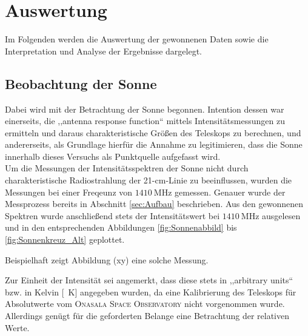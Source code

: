 \section{Auswertung}
Im Folgenden werden die Auswertung der gewonnenen Daten sowie die Interpretation und Analyse der Ergebnisse dargelegt.
    \subsection{Beobachtung der Sonne}
    Dabei wird mit der Betrachtung der Sonne begonnen.
    Intention dessen war einerseits, die ,,antenna response function`` mittels Intensitätsmessungen zu ermitteln und
    daraus charakteristische Größen des Teleskops zu berechnen, und andererseits, als Grundlage hierfür die Annahme zu legitimieren,
    dass die Sonne innerhalb dieses Versuchs als Punktquelle aufgefasst wird.\\

    Um die Messungen der Intensitätsspektren der Sonne nicht durch charakteristische Radiostrahlung der
    21-\si{\centi \metre}-Linie zu beeinflussen,
    wurden die Messungen bei einer Freqeunz von $\SI{1410}{\mega \hertz}$ gemessen.
    Genauer wurde der Messprozess bereits in Abschnitt \ref{sec:Aufbau} beschrieben. 
    Aus den gewonnenen Spektren wurde anschließend stets der Intensitätswert bei $\SI{1410}{\mega \hertz}$ ausgelesen und in den entsprechenden Abbildungen \ref{fig:Sonnenabbild} bis \ref{fig:Sonnenkreuz_Alt} geplottet. 

    Beispielhaft zeigt Abbildung (xy) eine solche Messung.

    Zur Einheit der Intensität sei angemerkt, dass diese stets in ,,arbitrary units`` bzw. in Kelvin [\SI{}{\kelvin}] angegeben wurden,
    da eine Kalibrierung des Teleskops für Absolutwerte vom \textsc{Onasala Space Observatory} nicht vorgenommen wurde.
    Allerdings genügt für die geforderten Belange eine Betrachtung der relativen Werte.\\

